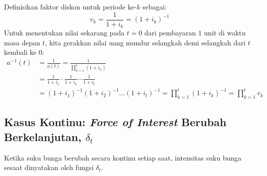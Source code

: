 \documentclass[11pt,a4paper]{article}
\begin{document}
\begin{notebox}
Definisikan faktor diskon untuk periode ke-$k$ sebagai:
\begin{equation*}
    v_k = \frac{1}{1 + i_k} = (1 + i_k)^{-1}
\end{equation*}
Untuk menentukan nilai sekarang pada $t = 0$ dari pembayaran $1$ unit di waktu masa depan $t$, kita gerakkan nilai uang mundur selangkah demi selangkah dari $t$ kembali ke $0$:
\begin{align}
    a^{-1}(t) &= \frac{1}{a(t)} = \frac{1}{\prod_{k=1}^t (1 + i_k)} \nonumber\\[0.5em]
              &= \frac{1}{1 + i_1} \cdot \frac{1}{1 + i_2} \cdots \frac{1}{1 + i_t} \nonumber\\[0.5em]
              &= (1 + i_1)^{-1}(1 + i_2)^{-1}\dots(1 + i_t)^{-1} = \prod_{k=1}^t (1 + i_k)^{-1} = \prod_{k=1}^t v_k
\end{align}
\end{notebox}

\subsection{Kasus Kontinu: \textit{Force of Interest} Berubah Berkelanjutan, $\delta_t$}
Ketika suku bunga berubah secara kontinu setiap saat, intensitas suku bunga sesaat dinyatakan oleh fungsi $\delta_t$.
\end{document}
